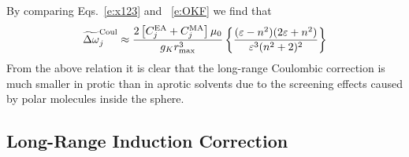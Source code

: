 \documentclass[a4paper,titlepage,twoside,fleqn,12pt]{book}
\begin{document}
\begin{refsection}
%
By comparing Eqs.~\eqref{e:x123} and ~\eqref{e:OKF}
we find that
%
\begin{equation} \label{e:x1234}
 \widetilde{\Delta \omega}_j^{\rm Coul} \approx 
\frac{2\left[ C^{\rm EA}_j + C^{\rm MA}_j \right]\mu_0}{g_Kr_{\rm max}^3}  
\left\{
\frac{(\varepsilon-n^2)(2\varepsilon+n^2)}{\varepsilon^3(n^2+2)^2}
\right\}
\end{equation}
%
From the above relation it is clear that the long\hyp{}range
Coulombic correction is much smaller in protic 
than in aprotic solvents due to the screening effects
caused by polar molecules inside the sphere.

\subsection{Long\hyp{}Range Induction Correction}


\end{refsection}
\end{document}

